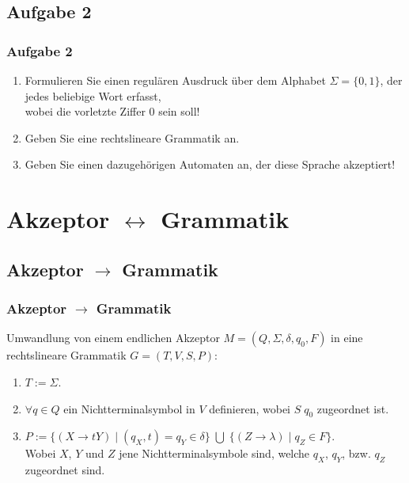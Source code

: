 \subsection{Aufgabe 2}
\begin{frame}
	\frametitle{Aufgabe 2}
	\begin{enumerate}
		\item Formulieren Sie einen regulären Ausdruck über dem Alphabet $\Sigma =
		\{0,1\}$, der jedes beliebige Wort erfasst,\\
		wobei die vorletzte Ziffer $0$ sein soll!
		\item Geben Sie eine rechtslineare Grammatik an.
		\item Geben Sie einen dazugehörigen Automaten an, der diese Sprache akzeptiert!
	\end{enumerate}
\end{frame}

\section{Akzeptor $\leftrightarrow$ Grammatik}
\subsection{Akzeptor $\rightarrow$ Grammatik}
\begin{frame}
	\frametitle{Akzeptor $\rightarrow$ Grammatik}
	Umwandlung von einem endlichen Akzeptor $M = (Q,\Sigma,\delta,q_0,F)$ in eine rechtslineare Grammatik $G = (T,V,S,P)$:
	\begin{enumerate}
		\item $T := \Sigma$.
		\item $\forall q \in Q$ ein Nichtterminalsymbol in $V$ definieren, wobei $S \; q_0$ zugeordnet ist.
		\item $P := \{(X \rightarrow tY) \;\vert\; (q_X,t)=q_Y \in \delta\} \;\bigcup\; \{(Z \rightarrow \lambda) \;\vert\; q_Z \in F\}$.~\\
		Wobei $X$, $Y$ und $Z$ jene Nichtterminalsymbole sind, welche $q_X$, $q_Y$, bzw. $q_Z$ zugeordnet sind. 
	\end{enumerate}
\end{frame}

